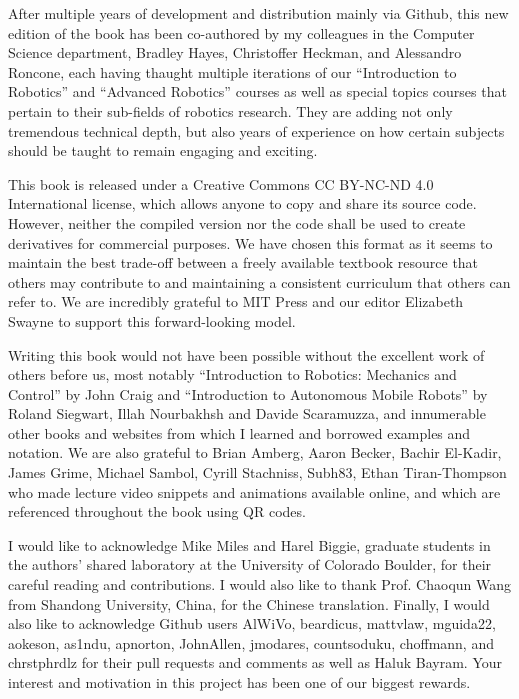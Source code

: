 \documentclass[paper=7in:9in,pagesize=pdftex,11pt,twoside,openright]{scrbook}
\begin{document}
After multiple years of development and distribution mainly via Github, this new edition of the book has been co-authored by my colleagues in the Computer Science department, Bradley Hayes, Christoffer Heckman, and Alessandro Roncone, each having thaught multiple iterations of our ``Introduction to Robotics'' and ``Advanced Robotics'' courses as well as special topics courses that pertain to their sub-fields of robotics research. They are adding not only tremendous technical depth, but also years of experience on how certain subjects should be taught to remain engaging and exciting.

This book is released under a Creative Commons CC BY-NC-ND 4.0 International license, which allows anyone to copy and share its source code. However, neither the compiled version nor the code shall be used to create derivatives for commercial purposes. We have chosen this format as it seems to maintain the best trade-off between a freely available textbook resource that others may contribute to and maintaining a consistent curriculum that others can refer to. We are incredibly grateful to MIT Press and our editor Elizabeth Swayne to support this forward-looking model.

Writing this book would not have been possible without the excellent work of others before us, most notably ``Introduction to Robotics: Mechanics and Control'' by John Craig and ``Introduction to Autonomous Mobile Robots'' by Roland Siegwart, Illah Nourbakhsh and Davide Scaramuzza, and innumerable other books and websites from which I learned and borrowed examples and notation. We are also grateful to Brian Amberg, Aaron Becker, Bachir El-Kadir,  James Grime, Michael Sambol, Cyrill Stachniss, Subh83, Ethan Tiran-Thompson who made lecture video snippets and animations available online, and which are referenced throughout the book using QR codes.

I would like to acknowledge Mike Miles and Harel Biggie, graduate students in the authors' shared laboratory at the University of Colorado Boulder, for their careful reading and contributions. I would also like to thank Prof. Chaoqun Wang from Shandong University, China, for the Chinese translation.  Finally, I would also like to acknowledge Github users AlWiVo, beardicus, mattvlaw, mguida22, aokeson, as1ndu, apnorton, JohnAllen, jmodares, countsoduku, choffmann, and chrstphrdlz for their pull requests and comments as well as Haluk Bayram. Your interest and motivation in this project has been one of our biggest rewards.
\end{document}
